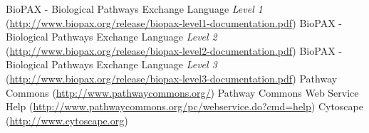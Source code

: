 \documentclass[10pt]{article}
\begin{document}
\begin{thebibliography}{99}
  BioPAX - Biological Pathways Exchange Language \textit{Level 1} (\href{http://www.biopax.org/release/biopax-level1-documentation.pdf}{http://www.biopax.org/release/biopax-level1-documentation.pdf})
  BioPAX - Biological Pathways Exchange Language \textit{Level 2} (\href{http://www.biopax.org/release/biopax-level2-documentation.pdf}{http://www.biopax.org/release/biopax-level2-documentation.pdf})
  BioPAX - Biological Pathways Exchange Language \textit{Level 3} (\href{http://www.biopax.org/release/biopax-level3-documentation.pdf}{http://www.biopax.org/release/biopax-level3-documentation.pdf})
  Pathway Commons (\href{http://www.pathwaycommons.org/}{http://www.pathwaycommons.org/})
  Pathway Commons Web Service Help (\href{http://www.pathwaycommons.org/pc/webservice.do?cmd=help}{http://www.pathwaycommons.org/pc/webservice.do?cmd=help})
  Cytoscape (\href{http://www.cytoscape.org}{http://www.cytoscape.org})
\end{thebibliography}
\end{document}
